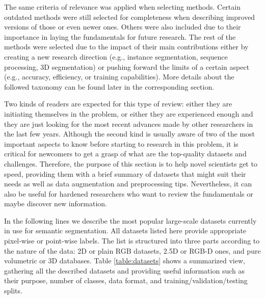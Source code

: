 The same criteria of relevance was applied when selecting methods. Certain outdated methods were still selected for completeness when describing improved versions of those or even newer ones. Others were also included due to their importance in laying the fundamentals for future research. The rest of the methods were selected due to the impact of their main contributions either by creating a new research direction (e.g., instance segmentation, sequence processing, 3D segmentation) or  pushing forward the limits of a certain aspect (e.g., accuracy, efficiency, or training capabilities). More details about the followed taxonomy can be found later in the corresponding section.

Two kinds of readers are expected for this type of review: either they are initiating themselves in the problem, or either they are experienced enough and they are just looking for the most recent advances made by other researchers in the last few years. Although the second kind is usually aware of two of the most important aspects to know before starting to research in this problem, it is critical for newcomers to get a grasp of what are the top-quality datasets and challenges. Therefore, the purpose of this section is to help novel scientists get to speed, providing them with a brief summary of datasets that might suit their needs as well as  data augmentation and preprocessing tips. Nevertheless, it can also be useful for hardened researchers who want to review the fundamentals or maybe discover new information. 

In the following lines we describe the most popular large-scale datasets currently in use for semantic segmentation. All datasets listed here provide appropriate pixel-wise or point-wise labels. The list is structured into three parts according to the nature of the data: \acs{2D} or plain \acs{RGB} datasets, \acs{2.5D} or \ac{RGB-D} ones, and pure volumetric or \acs{3D} databases. Table \ref{table:datasets} shows a summarized view, gathering all the described datasets and providing useful information such as their purpose, number of classes, data format, and training/validation/testing splits.

